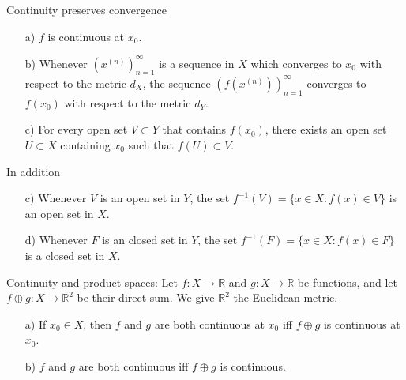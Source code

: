 \documentclass[10pt]{article}
\begin{document}
\begin{small}
    Continuity preserves convergence
    \begin{itemize}
        \item [a)] $f$ is continuous at $x_0$.
        \item [b)] Whenever $(x^{(n)})_{n=1}^{\infty}$ is a sequence in $X$ which converges to $x_0$ with respect to the metric $d_X$, the sequence $(f(x^{(n)}))_{n=1}^{\infty}$ converges to $f(x_0)$ with respect to the metric $d_Y$. 
        \item [c)] For every open set $V\subset Y$ that contains $f(x_0)$, there exists an open set $U\subset X$ containing $x_0$ such that $f(U)\subset V$.
    \end{itemize}
    In addition
    \begin{itemize}
        \item [c)] Whenever $V$ is an open set in $Y$, the set $f^{-1}(V)=\{x\in X:f(x)\in V\}$ is an open set in $X$.
        \item [d)] Whenever $F$ is an closed set in $Y$, the set $f^{-1}(F)=\{x\in X:f(x)\in F\}$ is a closed set in $X$.
    \end{itemize}
    Continuity and product spaces: Let $f:X\rightarrow\mathbb{R}$ and $g:X\rightarrow\mathbb{R}$ be functions, and let $f\oplus g:X\rightarrow\mathbb{R}^2$ be their direct sum. We give $\mathbb{R}^2$ the Euclidean metric. 
    \begin{itemize}
        \item [a)] If $x_0\in X$, then $f$ and $g$ are both continuous at $x_0$ iff $f\oplus g$ is continuous at $x_0$.
        \item [b)] $f$ and $g$ are both continuous iff $f\oplus g$ is continuous.
    \end{itemize} 

    \end{small}  
\end{document}
